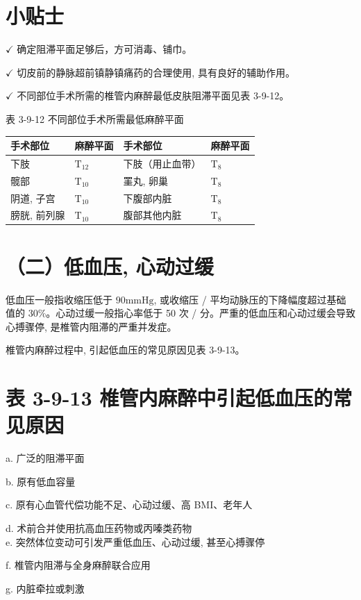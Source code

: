 \documentclass[10pt]{article}
\begin{document}
\section*{小贴士}
$\checkmark$ 确定阻滞平面足够后，方可消毒、铺巾。

$\checkmark$ 切皮前的静脉超前镇静镇痛药的合理使用, 具有良好的辅助作用。

$\checkmark$ 不同部位手术所需的椎管内麻醉最低皮肤阻滞平面见表 3-9-12。

表 3-9-12 不同部位手术所需最低麻醉平面

\begin{center}
\begin{tabular}{llll}
\hline
手术部位 & 麻醉平面 & 手术部位 & 麻醉平面 \\
\hline
下肢 & $\mathrm{T}_{12}$ & 下肢（用止血带） & $\mathrm{T}_{8}$ \\
髋部 & $\mathrm{T}_{10}$ & 罣丸, 卵巢 & $\mathrm{T}_{8}$ \\
阴道, 子宫 & $\mathrm{T}_{10}$ & 下腹部内脏 & $\mathrm{T}_{8}$ \\
膀胱, 前列腺 & $\mathrm{T}_{10}$ & 腹部其他内脏 & $\mathrm{T}_{8}$ \\
\hline
\end{tabular}
\end{center}

\section*{（二）低血压, 心动过缓}
低血压一般指收缩压低于 $90 \mathrm{mmHg}$, 或收缩压 / 平均动脉压的下降幅度超过基础值的 30\%。心动过缓一般指心率低于 50 次 / 分。严重的低血压和心动过缓会导致心搏骤停, 是椎管内阻滞的严重并发症。

椎管内麻醉过程中, 引起低血压的常见原因见表 3-9-13。

\section*{表 3-9-13 椎管内麻醉中引起低血压的常见原因}
a. 广泛的阻滞平面

b. 原有低血容量

c. 原有心血管代偿功能不足、心动过缓、高 BMI、老年人

d. 术前合并使用抗高血压药物或丙嗪类药物\\
e. 突然体位变动可引发严重低血压、心动过缓, 甚至心搏骤停

f. 椎管内阻滞与全身麻醉联合应用

g. 内脏牵拉或刺激
\end{document}
